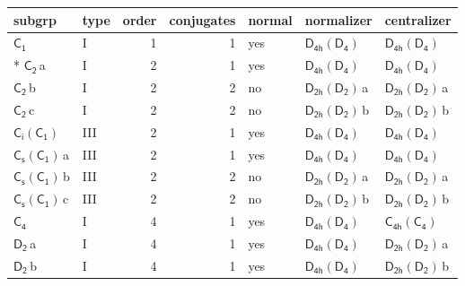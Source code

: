 \documentclass[10pt,a4paper]{article}
\numberwithin{equation}{section}
\newcommand{\grp}[1]{\mathsf{#1}}
\newcommand{\clsletter}[1]{\,{\scriptsize\color{black!55}#1}}
\begin{document}
{\small\begin{longtable}{@{}llrrlll@{}}\toprule
subgrp & type & order & conjugates & normal & normalizer & centralizer\\\midrule\endhead
\bottomrule\endfoot\endlastfoot
\href{../../../rotation/data/pdf/C1.pdf}{$\grp{C_{1}}$} & I & 1 & 1 & yes & \href{D4h-D4.pdf}{$\grp{D_{4h}}(\grp{D_{4}})$} & \href{D4h-D4.pdf}{$\grp{D_{4h}}(\grp{D_{4}})$}\\*
\href{../../../rotation/data/pdf/C2.pdf}{$\grp{C_{2}}$}\clsletter{a} & I & 2 & 1 & yes & \href{D4h-D4.pdf}{$\grp{D_{4h}}(\grp{D_{4}})$} & \href{D4h-D4.pdf}{$\grp{D_{4h}}(\grp{D_{4}})$}\\
\href{../../../rotation/data/pdf/C2.pdf}{$\grp{C_{2}}$}\clsletter{b} & I & 2 & 2 & no & \href{D2h-D2.pdf}{$\grp{D_{2h}}(\grp{D_{2}})$}\clsletter{a} & \href{D2h-D2.pdf}{$\grp{D_{2h}}(\grp{D_{2}})$}\clsletter{a}\\
\href{../../../rotation/data/pdf/C2.pdf}{$\grp{C_{2}}$}\clsletter{c} & I & 2 & 2 & no & \href{D2h-D2.pdf}{$\grp{D_{2h}}(\grp{D_{2}})$}\clsletter{b} & \href{D2h-D2.pdf}{$\grp{D_{2h}}(\grp{D_{2}})$}\clsletter{b}\\
\href{S2-C1.pdf}{$\grp{C_{i}}(\grp{C_{1}})$} & III & 2 & 1 & yes & \href{D4h-D4.pdf}{$\grp{D_{4h}}(\grp{D_{4}})$} & \href{D4h-D4.pdf}{$\grp{D_{4h}}(\grp{D_{4}})$}\\
\href{C1v-C1.pdf}{$\grp{C_{s}}(\grp{C_{1}})$}\clsletter{a} & III & 2 & 1 & yes & \href{D4h-D4.pdf}{$\grp{D_{4h}}(\grp{D_{4}})$} & \href{D4h-D4.pdf}{$\grp{D_{4h}}(\grp{D_{4}})$}\\
\href{C1v-C1.pdf}{$\grp{C_{s}}(\grp{C_{1}})$}\clsletter{b} & III & 2 & 2 & no & \href{D2h-D2.pdf}{$\grp{D_{2h}}(\grp{D_{2}})$}\clsletter{a} & \href{D2h-D2.pdf}{$\grp{D_{2h}}(\grp{D_{2}})$}\clsletter{a}\\
\href{C1v-C1.pdf}{$\grp{C_{s}}(\grp{C_{1}})$}\clsletter{c} & III & 2 & 2 & no & \href{D2h-D2.pdf}{$\grp{D_{2h}}(\grp{D_{2}})$}\clsletter{b} & \href{D2h-D2.pdf}{$\grp{D_{2h}}(\grp{D_{2}})$}\clsletter{b}\\
\href{../../../rotation/data/pdf/C4.pdf}{$\grp{C_{4}}$} & I & 4 & 1 & yes & \href{D4h-D4.pdf}{$\grp{D_{4h}}(\grp{D_{4}})$} & \href{C4h-C4.pdf}{$\grp{C_{4h}}(\grp{C_{4}})$}\\
\href{../../../rotation/data/pdf/D2.pdf}{$\grp{D_{2}}$}\clsletter{a} & I & 4 & 1 & yes & \href{D4h-D4.pdf}{$\grp{D_{4h}}(\grp{D_{4}})$} & \href{D2h-D2.pdf}{$\grp{D_{2h}}(\grp{D_{2}})$}\clsletter{a}\\
\href{../../../rotation/data/pdf/D2.pdf}{$\grp{D_{2}}$}\clsletter{b} & I & 4 & 1 & yes & \href{D4h-D4.pdf}{$\grp{D_{4h}}(\grp{D_{4}})$} & \href{D2h-D2.pdf}{$\grp{D_{2h}}(\grp{D_{2}})$}\clsletter{b}\\

\end{longtable}}
\end{document}
